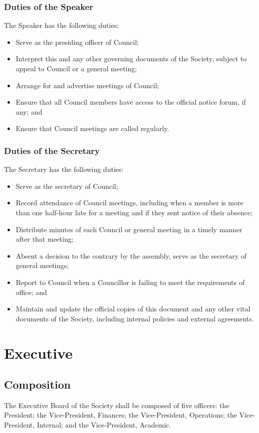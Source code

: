 \subsubsection{Duties of the Speaker}
The Speaker has the following duties:
\begin{itemize}
  \item Serve as the presiding officer of Council;
  \item Interpret this and any other governing documents of the Society, subject
    to appeal to Council or a general meeting;
  \item Arrange for and advertise meetings of Council;
  \item Ensure that all Council members have access to the official notice
    forum, if any; and
  \item Ensure that Council meetings are called regularly.
\end{itemize}

\subsubsection{Duties of the Secretary}
The Secretary has the following duties:
\begin{itemize}
  \item Serve as the secretary of Council;
  \item Record attendance of Council meetings, including when a member is more
    than one half-hour late for a meeting and if they sent notice of their
    absence;
  \item Distribute minutes of each Council or general meeting in a timely manner
    after that meeting;
  \item Absent a decision to the contrary by the assembly, serve as the
    secretary of general meetings;
  \item Report to Council when a Councillor is failing to meet the requirements
    of office; and
  \item Maintain and update the official copies of this document and any other
    vital documents of the Society, including internal policies and external
    agreements.
\end{itemize}

\section{Executive}
\subsection{Composition}
The Executive Board of the Society shall be composed of five officers: the
President; the Vice-President, Finances; the Vice-President, Operations; the
Vice-President, Internal; and the Vice-President, Academic.


